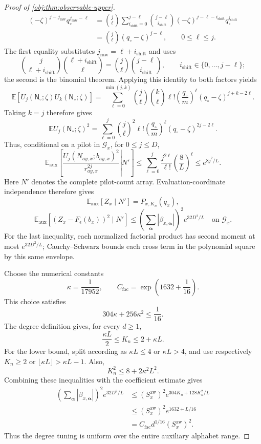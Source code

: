 \begin{proof}[Proof of \cref{obj:thm:observable-upper}]
\[\begin{aligned}
(-\zeta)^{j-j_{\mathrm{raw}}}
q_\circ^{j_{\mathrm{raw}}-\ell}
&=
\binom j\ell
\sum_{i_{\mathrm{shift}}=0}^{j-\ell}
\binom{j-\ell}{i_{\mathrm{shift}}}
(-\zeta)^{j-\ell-i_{\mathrm{shift}}}
q_\circ^{i_{\mathrm{shift}}}\\
&=\binom j\ell(q_\circ-\zeta)^{j-\ell},
\qquad 0\le\ell\le j.
\end{aligned}
\]
The first equality substitutes \(j_{\mathrm{raw}}=\ell+i_{\mathrm{shift}}\) and uses
\[
\binom j{\ell+i_{\mathrm{shift}}}
\binom{\ell+i_{\mathrm{shift}}}\ell
=
\binom j\ell\binom{j-\ell}{i_{\mathrm{shift}}},
\qquad
 i_{\mathrm{shift}}\in\{0,\ldots,j-\ell\};
\]
the second is the binomial theorem. Applying this identity to both factors yields
\[
\mathbb E[U_j(\mathsf N_\circ;\zeta)U_k(\mathsf N_\circ;\zeta)]
=
\sum_{\ell=0}^{\min(j,k)}
\binom j\ell\binom k\ell\ell!
\left(\frac{q_\circ}{m}\right)^\ell
(q_\circ-\zeta)^{j+k-2\ell}.
\]
Taking \(k=j\) therefore gives
\[
\mathbb E U_j(\mathsf N_\circ;\zeta)^2
=
\sum_{\ell=0}^{j}
\binom j\ell^2\ell!
\left(\frac{q_\circ}{m}\right)^\ell
(q_\circ-\zeta)^{2j-2\ell}.
\]
Thus, conditional on a pilot in \(\mathcal G_x\), for \(0\le j\le D\),
\[
\mathbb E_{\mathrm{aux}}
\left[
\left.
\frac{U_j(N_{ay,x};b_{ay,x})^2}{r_{ay,x}^{2j}}
\right|N'
\right]
\le
\sum_{\ell=0}^{j}\frac{j^{2\ell}}{\ell!}
\left(\frac8L\right)^\ell
\le e^{8j^2/L}.
\]
Here \(N'\) denotes the complete pilot-count array. Evaluation-coordinate independence therefore gives
\[
\mathbb E_{\mathrm{aux}}[Z_x\mid N']
=P_{x,K_n}(q_x),
\]
\[
\mathbb E_{\mathrm{aux}}
[(Z_x-F_\epsilon(b_x))^2\mid N']
\le
\left(\sum_{\boldsymbol\alpha}|\beta_{x,\boldsymbol\alpha}|\right)^2
e^{32D^2/L}
\quad\text{on }\mathcal G_x.
\]
For the last inequality, each normalized factorial product has second moment at most \(e^{32D^2/L}\); Cauchy--Schwarz bounds each cross term in the polynomial square by this same envelope.

Choose the numerical constants
\[
\kappa=\frac1{17952},
\qquad
C_{\mathrm{fac}}=\exp\left(1632+\frac1{16}\right).
\]
This choice satisfies
\[
304\kappa+256\kappa^2\le\frac1{16}.
\]
The degree definition gives, for every \(d\ge1\),
\[
\frac{\kappa L}{2}\le K_n\le2+\kappa L.
\]
For the lower bound, split according as \(\kappa L\le4\) or \(\kappa L>4\), and use respectively \(K_n\ge2\) or
\(\lfloor\kappa L\rfloor>\kappa L-1\). Also,
\[
K_n^2\le8+2\kappa^2L^2.
\]
Combining these inequalities with the coefficient estimate gives
\[
\begin{aligned}
\left(\sum_{\boldsymbol\alpha}|\beta_{x,\boldsymbol\alpha}|\right)^2
e^{32D^2/L}
&\le
(S_x^{\mathrm{aw}})^2
e^{304K_n+128K_n^2/L}\\
&\le
(S_x^{\mathrm{aw}})^2e^{1632+L/16}\\
&=
C_{\mathrm{fac}}d^{1/16}(S_x^{\mathrm{aw}})^2.
\end{aligned}
\]
Thus the degree tuning is uniform over the entire auxiliary alphabet range.


\end{proof}
